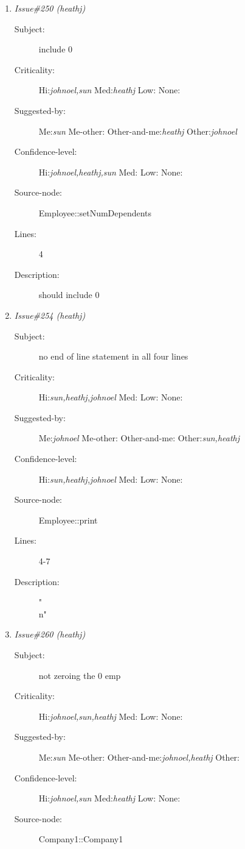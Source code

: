 \begin{enumerate}
\begin{description}
\item [Lines:] 22

\item [Description:] newnumber
\end{description}
\item {\it Issue\#250 (heathj)}
\begin{description}
\item [Subject:] include 0
\item [Criticality:] Hi:{\it johnoel,sun} Med:{\it heathj} Low:{\it } None:{\it }
\item [Suggested-by:] Me:{\it sun} Me-other:{\it } Other-and-me:{\it heathj} Other:{\it johnoel}
\item [Confidence-level:] Hi:{\it johnoel,heathj,sun} Med:{\it } Low:{\it } None:{\it }
\item [Source-node:] Employee::setNumDependents

\item [Lines:] 4

\item [Description:] should include 0
\end{description}
\item {\it Issue\#254 (heathj)}
\begin{description}
\item [Subject:] no end of line statement in all four lines
\item [Criticality:] Hi:{\it sun,heathj,johnoel} Med:{\it } Low:{\it } None:{\it }
\item [Suggested-by:] Me:{\it johnoel} Me-other:{\it } Other-and-me:{\it } Other:{\it sun,heathj}
\item [Confidence-level:] Hi:{\it sun,heathj,johnoel} Med:{\it } Low:{\it } None:{\it }
\item [Source-node:] Employee::print

\item [Lines:] 4-7

\item [Description:] "\\n"
\end{description}
\item {\it Issue\#260 (heathj)}
\begin{description}
\item [Subject:] not zeroing the 0 emp
\item [Criticality:] Hi:{\it johnoel,sun,heathj} Med:{\it } Low:{\it } None:{\it }
\item [Suggested-by:] Me:{\it sun} Me-other:{\it } Other-and-me:{\it johnoel,heathj} Other:{\it }
\item [Confidence-level:] Hi:{\it johnoel,sun} Med:{\it heathj} Low:{\it } None:{\it }
\item [Source-node:] Company1::Company1


\end{description}
\end{enumerate}
